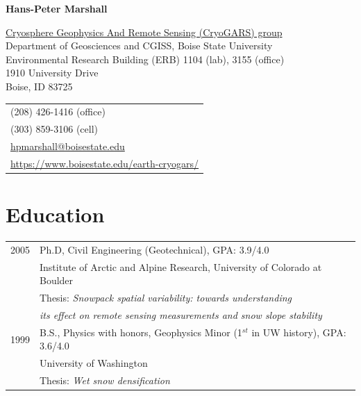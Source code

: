 \documentclass[11pt]{article}
\def\name{Hans-Peter Marshall}
\begin{document}


\centerline{\Large \bf \name}

\vspace{0.25in}

\begin{minipage}{0.70\linewidth}
  \href{http://earth.boisestate.edu/cryogars/}{Cryosphere Geophysics And Remote Sensing (CryoGARS) group} \\
  Department of Geosciences and CGISS, Boise State University \\
  Environmental Research Building (ERB) 1104 (lab), 3155 (office) \\
  1910 University Drive \\
  Boise, ID  83725
\end{minipage}
\begin{minipage}{0.30\linewidth}
  \begin{tabular}{l}
     (208) 426-1416 (office) \\
     (303) 859-3106 (cell) \\
    \href{mailto:hpmarshall@boisestate.edu}{hpmarshall@boisestate.edu} \\
    \href{https://www.boisestate.edu/earth-cryogars/}{https://www.boisestate.edu/earth-cryogars/} \\
  \end{tabular}
\end{minipage}

\section*{Education}

\begin{tabular}{ll}
	2005 & Ph.D, Civil Engineering (Geotechnical), GPA: 3.9/4.0 \\
	          & Institute of Arctic and Alpine Research, University of Colorado at Boulder \\
		 & Thesis: \textit{Snowpack spatial variability: towards understanding} \\
                  &   \textit{its effect on remote sensing measurements and snow slope stability} \\
	1999 &  B.S., Physics with honors, Geophysics Minor (1$^{st}$ in UW history), GPA: 3.6/4.0 \\
	         &   University of Washington \\
	         &  Thesis: \textit{Wet snow densification} \\
\end{tabular}
\end{document}
